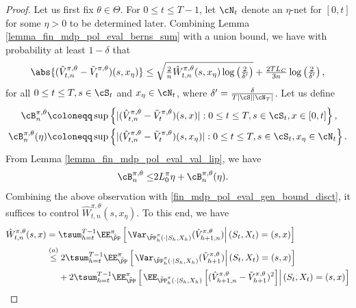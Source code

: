 \documentclass[9pt]{article}
\numberwithin{equation}{section}
\begin{document}
\begin{proof}
Let us first  fix $\theta \in \Theta$.
    For $0 \leq t \leq T-1$, let $\cN_t$ denote an $\eta$-net for $[0, t]$ for some $\eta > 0$ to be determined later. Combining Lemma \ref{lemma_fin_mdp_pol_eval_berns_sum} with a union bound, we have with probability at least $1-\delta$ that
    \begin{equation}
        \label{fin_mdp_pol_eval_gen_bound_disct}
        \abs{ (\hat{V}_{t,n}^{\pi, \theta} - \tilde{V}_{t}^{\pi, \theta})(s,x_\eta)} \leq \sqrt{\tfrac{2}{n} \hat{W}_{t, n}^{\pi, \theta}(s,x_\eta)\log\left(\tfrac{2}{\delta'}\right)} + \tfrac{2 T L_C}{3n}  \log\left(\tfrac{2}{\delta'}\right),
    \end{equation}
    for all $0 \leq t \leq T, s \in \cS_t $ and $ x_\eta \in \cN_t$, where $\delta' = \tfrac{\delta}{T |\cS| |\cN_T|}$. Let us define
    \begin{align}
        \cB^{\pi,\theta}_n & \coloneqq \sup\left\{|(\hat{V}_{t,n}^{\pi, \theta} - \tilde{V}_{t}^{\pi, \theta})(s,x)| :0 \leq t \leq T, s \in \cS_t, x \in [0,t]\right\}, \label{fin_mdp_pol_eval_sup_def}\\
        \cB^{\pi,\theta}_n(\eta) & \coloneqq \sup\left\{|(\hat{V}_{t,n}^{\pi, \theta} - \tilde{V}_{t}^{\pi, \theta})(s,x_\eta) | : 0 \leq t \leq T, s \in \cS_t, x_\eta \in \cN_t\right\}. \label{fin_mdp_pol_eval_sup_disc_def}
    \end{align}
    From Lemma \ref{lemma_fin_mdp_pol_eval_val_lip}, we have
    \begin{align}
       \cB^{\pi,\theta}_n \leq &  2L_0^\pi \eta + \cB^{\pi,\theta}_n(\eta). \label{fin_mdp_pol_eval_gen_bound}
    \end{align}
    Combining the above observation with  \eqref{fin_mdp_pol_eval_gen_bound_disct}, it suffices to control $\hat{W}_{t, n}^{\pi, \theta}(s,x_\eta)$.
    To this end, we have
    \begin{align}
        \hat{W}_{t, n}^{\pi, \theta} (s,x) & = \tsum_{h = t}^{T-1} \EE_{\tilde \PP}^\pi \left[ \left. \Var_{\tilde{\PP}_h^\pi (\cdot|S_{h}, X_{h})} (\hat{V}_{h+1,n}^{\pi, \theta}) \right| (S_t, X_t) = (s,x) \right] \nonumber \\
        & \overset{(a)}{\leq} 2 \tsum_{h=t}^{T-1} \EE_{\tilde \PP}^\pi \left[ \left. \Var_{\tilde{\PP}_{h}^{\pi}(\cdot| S_{h}, X_{h})} ( \tilde{V}_{h+1}^{\pi, \theta}) \right| (S_t, X_t) = (s,x) \right] \nonumber \\
        & ~~~~ + 2 \tsum_{h = t}^{T-1} \EE_{\tilde \PP}^\pi \left[ \left. \EE_{\tilde{\PP}_{h}^{\pi}(\cdot| S_{h}, X_{h})} \left[(\hat{V}_{h+1,n}^{\pi, \theta} - \tilde{V}_{h+1}^{\pi, \theta})^2\right] \right| (S_t, X_t) = (s,x) \right] \label{elemental_variance_comparison} \\

\end{align}
\end{proof}
\end{document}

